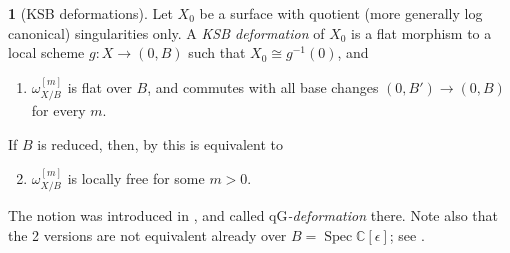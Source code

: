 \documentclass{amsart}
\theoremstyle{definition}
\newtheorem{say}[thm]{}
\theoremstyle{remark}
\renewcommand{\c}[0]{{\mathbb C}}
\newcommand{\spec}[0]{\operatorname{Spec}}
\newcommand{\qg}[0]{\ensuremath{\mathrm{qG}}}
\begin{document}



\begin{say}[KSB deformations]\label{ksb.defs.say.0}
  Let $X_0$ be a surface with quotient (more generally log canonical) singularities only. A {\it KSB deformation} of $X_0$ 
  is a flat morphism to a local scheme $g: X\to (0,B)$ such that
  $X_0\cong g^{-1}(0)$, and
  \begin{enumerate}
  \item $\omega_{X/B}^{[m]}$ is flat over $B$, and  commutes with all base changes $(0,B')\to (0, B)$ for every $m$.
  \end{enumerate}
  If $B$ is reduced, then, by \cite[2.3 and 4.7]{k-modbook} this is equivalent to 
\begin{enumerate}\setcounter{enumi}{1}
  \item $\omega_{X/B}^{[m]}$ is locally free for some  $m>0$.
\end{enumerate}
The notion was introduced in \cite{ksb}, and called {\it  $\qg$-deformation} there. Note also that the 2 versions are not equivalent already over
$B=\spec \c[\epsilon]$; see \cite{k-alt}. 
\end{say}
\end{document}
